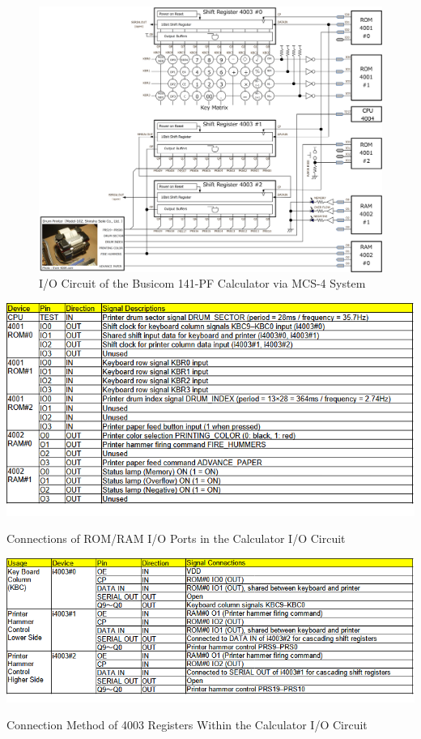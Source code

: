 \begin{figure}[htbp]
  \centering
  \includegraphics[width=1.0\textwidth]{./Figure/IOBlock141PF.png}
  \caption{I/O Circuit of the Busicom 141-PF Calculator via MCS-4 System}
  \label{fig:IOBLOCK141PF}
\end{figure}
\begin{table}[htbp]
    \includegraphics[width=1.00\columnwidth]{./Table/ROMRAMPort.png}
    \caption{Connections of ROM/RAM I/O Ports in the Calculator I/O Circuit}
    \label{tb:ROMRAMPORT}
\end{table}
\begin{table}[htbp]
    \includegraphics[width=1.00\columnwidth]{./Table/Usage4003.png}
    \caption{Connection Method of 4003 Registers Within the Calculator I/O Circuit}
    \label{tb:USAGE4003}
\end{table}

